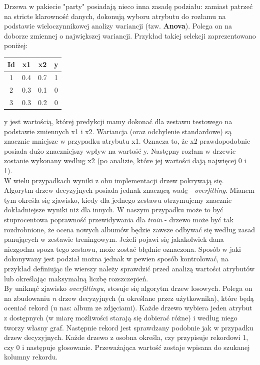 \documentclass[a4paper,twoside]{article}
\begin{document}
Drzewa w pakiecie "party" posiadają nieco inna zasadę podziału: zamiast patrzeć na stricte klarowność danych, dokonują wyboru atrybutu do rozłamu na podstawie wieloczynnikowej analizy wariancji (tzw. \textbf{Anova}). Polega on na doborze zmiennej o największej wariancji. Przykład takiej selekcji zaprezentowano poniżej:

\begin{center}
\begin{tabular}{|c|c|c|c|}
	\hline Id & x1 & x2 & y \\ 
	\hline 1 & 0.4 & 0.7 & 1 \\ 
	\hline 2 & 0.3 & 0.1 & 0 \\ 
	\hline 3 & 0.3 & 0.2 & 0 \\ 
	\hline 
\end{tabular} 
\end{center}

y jest wartością, której predykcji mamy dokonać dla zestawu testowego na podstawie zmiennych x1 i x2. Wariancja (oraz odchylenie standardowe) są znacznie mniejsze w przypadku atrybutu x1. Oznacza to, że x2 prawdopodobnie posiada dużo znaczniejszy wpływ na wartość y. Następny rozłam w drzewie zostanie wykonany według x2 (po analizie, które jej wartości dają najwięcej 0 i 1). \\
W wielu przypadkach wyniki z obu implementacji drzew pokrywają się.\\

Algorytm drzew decyzyjnych posiada jednak znaczącą wadę - \textit{overfitting}. Mianem tym określa się zjawisko, kiedy dla jednego zestawu otrzymujemy znacznie dokładniejsze wyniki niż dla innych. W naszym przypadku może to być stuprocentowa poprawność przewidywania dla \textit{train} - drzewo może być tak rozdrobnione, że ocena nowych albumów będzie zawsze odbywać się według zasad panujących w zestawie treningowym. Jeżeli pojawi się jakakolwiek dana niezgodna spoza tego zestawu, może zostać błędnie oznaczona. Sposób w jaki dokonywany jest podział można jednak w pewien sposób kontrolować, na przykład definiując ile wierszy należy sprawdzić przed analizą wartości atrybutów lub określając maksymalną liczbę rozszczepień. \\

By uniknąć zjawisko \textit{overfittingu}, stosuje się algorytm drzew losowych. Polega on na zbudowaniu \textit{n} drzew decyzyjnych (n określane przez użytkownika), które będą oceniać rekord (u nas: album ze zdjęciami). Każde drzewo wybiera jeden atrybut z dostępnych (w miarę możliwości starają się dobierać różne) i według niego tworzy własny graf. Następnie rekord jest sprawdzany podobnie jak w przypadku drzew decyzyjnych. Każde drzewo z osobna określa, czy przypisuje rekordowi 1, czy 0 i następuje głosowanie. Przeważająca wartość zostaje wpisana do szukanej kolumny rekordu.
\end{document}

